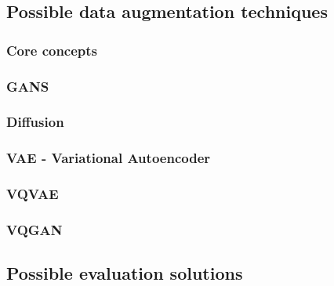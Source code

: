 \subsection{Possible data augmentation techniques}

\subsubsection{Core concepts}

\newpage
\subsubsection{GANS}

\newpage
\subsubsection{Diffusion}

\newpage
\subsubsection{VAE - Variational Autoencoder}

\newpage
\subsubsection{VQVAE}

\newpage
\subsubsection{VQGAN} 



\newpage
\subsection{Possible evaluation solutions}
